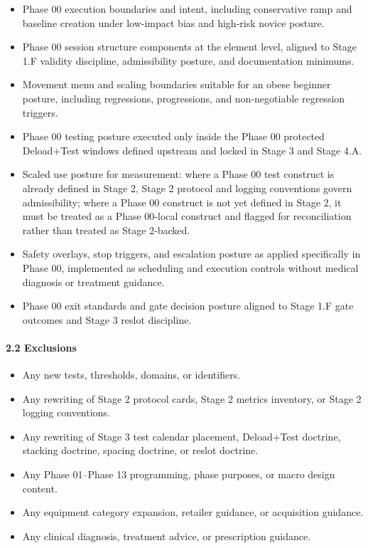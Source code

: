 \documentclass[10pt]{article}
\begin{document}
\begin{itemize}
\item Phase 00 execution boundaries and intent, including conservative ramp and baseline creation under low-impact bias and high-risk novice posture.
\item Phase 00 session structure components at the element level, aligned to Stage 1.F validity discipline, admissibility posture, and documentation minimums.
\item Movement menu and scaling boundaries suitable for an obese beginner posture, including regressions, progressions, and non-negotiable regression triggers.
\item Phase 00 testing posture executed only inside the Phase 00 protected Deload+Test windows defined upstream and locked in Stage 3 and Stage 4.A.
\item Scaled use posture for measurement: where a Phase 00 test construct is already defined in Stage 2, Stage 2 protocol and logging conventions govern admissibility; where a Phase 00 construct is not yet defined in Stage 2, it must be treated as a Phase 00-local construct and flagged for reconciliation rather than treated as Stage 2-backed.
\item Safety overlays, stop triggers, and escalation posture as applied specifically in Phase 00, implemented as scheduling and execution controls without medical diagnosis or treatment guidance.
\item Phase 00 exit standards and gate decision posture aligned to Stage 1.F gate outcomes and Stage 3 reslot discipline.
\end{itemize}

\paragraph*{2.2 Exclusions}

\begin{itemize}
\item Any new tests, thresholds, domains, or identifiers.
\item Any rewriting of Stage 2 protocol cards, Stage 2 metrics inventory, or Stage 2 logging conventions.
\item Any rewriting of Stage 3 test calendar placement, Deload+Test doctrine, stacking doctrine, spacing doctrine, or reslot doctrine.
\item Any Phase 01–Phase 13 programming, phase purposes, or macro design content.
\item Any equipment category expansion, retailer guidance, or acquisition guidance.
\item Any clinical diagnosis, treatment advice, or prescription guidance.
\end{itemize}
\end{document}
